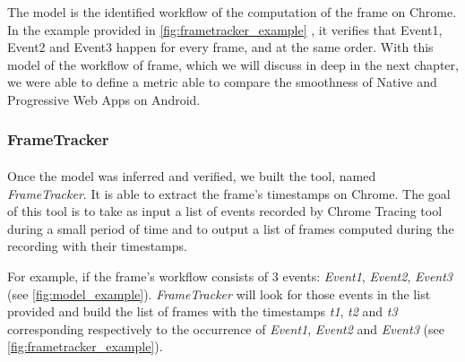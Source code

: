 \documentclass{kththesis}
\begin{document}
    
    
    The model is the identified workflow of the computation of the frame on Chrome. In the example provided in \autoref{fig:frametracker_example} , it verifies that Event1, Event2 and Event3 happen for every frame, and at the same order. 
   With this model of the workflow of frame, which we will discuss in deep in the next chapter, we were able to define a metric able to compare the smoothness of Native  and Progressive Web Apps on Android. 
    
    
    
    \subsubsection{FrameTracker}   
       
    \paragraph{}
    
    Once the model was inferred and verified, we built the tool, named \textit{FrameTracker}. It is able to extract the frame's timestamps on Chrome. The goal of this tool is to take as input a list of events recorded by Chrome Tracing tool during a small period of time and to output a list of frames  computed during the recording with their timestamps.
    
    For example, if the frame's workflow consists of 3 events: \textit{Event1}, \textit{Event2}, \textit{Event3} (see \autoref{fig:model_example}). \textit{FrameTracker} will look for those events in the list provided and build the list of frames with the timestamps \textit{t1}, \textit{t2} and \textit{t3} corresponding respectively to the occurrence of \textit{Event1}, \textit{Event2} and \textit{Event3} (see \autoref{fig:frametracker_example}).
    
\end{document}
